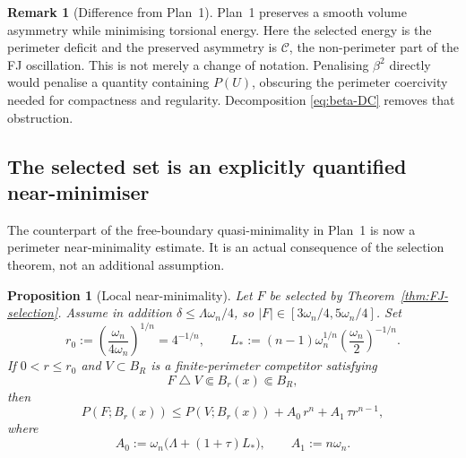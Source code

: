 \documentclass[11pt]{amsart}
\newtheorem{proposition}[theorem]{Proposition}
\theoremstyle{definition}
\newtheorem{remark}[theorem]{Remark}
\newcommand{\Per}{P}
\begin{document}
\begin{remark}[Difference from Plan~1]\label{rem:selection-difference}
Plan~1 preserves a smooth volume asymmetry while minimising torsional energy.
Here the selected energy is the perimeter deficit and the preserved
asymmetry is \(\mathcal C\), the non-perimeter part of the FJ oscillation.
This is not merely a change of notation.  Penalising \(\beta^2\) directly
would penalise a quantity containing \(\Per(U)\), obscuring the perimeter
coercivity needed for compactness and regularity.  Decomposition
\eqref{eq:beta-DC} removes that obstruction.
\end{remark}

\subsection{The selected set is an explicitly quantified near-minimiser}

The counterpart of the free-boundary quasi-minimality in Plan~1 is now a
perimeter near-minimality estimate.  It is an actual consequence of the
selection theorem, not an additional assumption.

\begin{proposition}[Local near-minimality]\label{prop:near-min}
Let \(F\) be selected by Theorem~\ref{thm:FJ-selection}.  Assume in addition
\(\delta\le\Lambda\omega_n/4\), so \(|F|\in[3\omega_n/4,5\omega_n/4]\).
Set
\[
   r_0:=\left(\frac{\omega_n}{4\omega_n}\right)^{1/n}=4^{-1/n},
   \qquad
   L_*:=(n-1)\omega_n^{1/n}\left(\frac{\omega_n}{2}\right)^{-1/n}.
\tag{4.25}\label{eq:r0-L}
\]
If \(0<r\le r_0\) and \(V\subset B_R\) is a finite-perimeter competitor
satisfying
\[
   F\mathbin{\triangle}V\Subset B_r(x)\Subset B_R,
\tag{4.26}\label{eq:local-competitor}
\]
then
\[
   \Per(F;B_r(x))
   \le\Per(V;B_r(x))
      +A_0\,r^n+A_1\,\tau r^{n-1},
\tag{4.27}\label{eq:near-min}
\]
where
\[
   A_0:=\omega_n\bigl(\Lambda+(1+\tau)L_*\bigr),
   \qquad
   A_1:=n\omega_n.
\tag{4.28}\label{eq:A01}
\]
\end{proposition}
\end{document}
